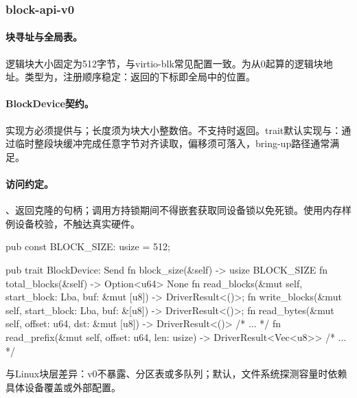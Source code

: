 
\subsubsection{block-api-v0}

\paragraph{块寻址与全局表。}逻辑块大小固定为512字节，与virtio-blk常见配置一致。为从0起算的逻辑块地址。类型为，注册顺序稳定：返回的下标即全局中的位置。

\paragraph{BlockDevice契约。}实现方必须提供与；长度须为块大小整数倍。不支持时返回。trait默认实现与：通过临时整段块缓冲完成任意字节对齐读取，偏移须可落入，bring-up路径通常满足。

\paragraph{访问约定。}、返回克隆的句柄；调用方持锁期间不得嵌套获取同设备锁以免死锁。使用内存样例设备校验，不触达真实硬件。

\begin{rustcode}
pub const BLOCK_SIZE: usize = 512;

pub trait BlockDevice: Send {
    fn block_size(&self) -> usize { BLOCK_SIZE }
    fn total_blocks(&self) -> Option<u64> { None }
    fn read_blocks(&mut self, start_block: Lba, buf: &mut [u8]) -> DriverResult<()>;
    fn write_blocks(&mut self, start_block: Lba, buf: &[u8]) -> DriverResult<()>;
    fn read_bytes(&mut self, offset: u64, dst: &mut [u8]) -> DriverResult<()> { /* ... */ }
    fn read_prefix(&mut self, offset: u64, len: usize) -> DriverResult<Vec<u8>> { /* ... */ }
}
\end{rustcode}

与Linux块层差异：v0不暴露、分区表或多队列；默认，文件系统探测容量时依赖具体设备覆盖或外部配置。
